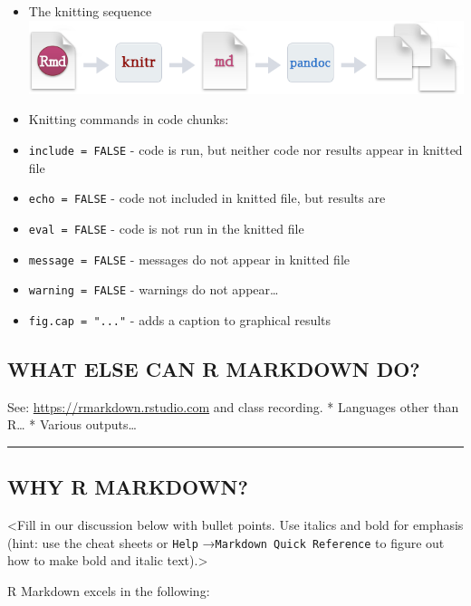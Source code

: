 \documentclass[
]{article}
\begin{document}
\begin{itemize}
\item
  The knitting sequence
  \includegraphics{../lessons/img/rmarkdownflow.png}
\item
  Knitting commands in code chunks:
\item
  \texttt{include\ =\ FALSE} - code is run, but neither code nor results
  appear in knitted file
\item
  \texttt{echo\ =\ FALSE} - code not included in knitted file, but
  results are
\item
  \texttt{eval\ =\ FALSE} - code is not run in the knitted file
\item
  \texttt{message\ =\ FALSE} - messages do not appear in knitted file
\item
  \texttt{warning\ =\ FALSE} - warnings do not appear\ldots{}
\item
  \texttt{fig.cap\ =\ "..."} - adds a caption to graphical results
\end{itemize}

\hypertarget{what-else-can-r-markdown-do}{%
\subsection{WHAT ELSE CAN R MARKDOWN
DO?}\label{what-else-can-r-markdown-do}}

See: \url{https://rmarkdown.rstudio.com} and class recording. *
Languages other than R\ldots{} * Various outputs\ldots{}

\begin{center}\rule{0.5\linewidth}{0.5pt}\end{center}

\hypertarget{why-r-markdown}{%
\subsection{WHY R MARKDOWN?}\label{why-r-markdown}}

\textless Fill in our discussion below with bullet points. Use italics
and bold for emphasis (hint: use the cheat sheets or \texttt{Help}
→\texttt{Markdown\ Quick\ Reference} to figure out how to make bold and
italic text).\textgreater{}

R Markdown excels in the following:
\end{document}
